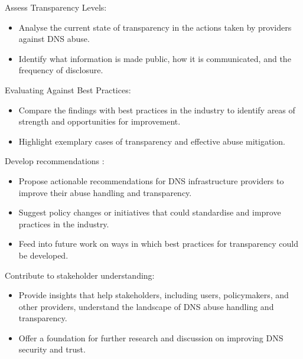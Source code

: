 Assess Transparency Levels:

\begin{itemize}
  \item Analyse the current state of transparency in the actions taken by providers against DNS abuse.
  \item Identify what information is made public, how it is communicated, and the frequency of disclosure.
\end{itemize}

Evaluating Against Best Practices:

\begin{itemize}
  \item Compare the findings with best practices in the industry to identify areas of strength and opportunities for improvement.
  \item Highlight exemplary cases of transparency and effective abuse mitigation.
\end{itemize}

\vspace{40px}
Develop recommendations :

\begin{itemize}
  \item Propose actionable recommendations for DNS infrastructure providers to improve their abuse handling and transparency.
  \item Suggest policy changes or initiatives that could standardise and improve practices in the industry.
  \item Feed into future work on ways in which best practices for transparency could be developed.
\end{itemize}

Contribute to stakeholder understanding: 

\begin{itemize}
  \item Provide insights that help stakeholders, including users, policymakers, and other providers, understand the landscape of DNS abuse handling and transparency.
  \item Offer a foundation for further research and discussion on improving DNS security and trust.
\end{itemize}

